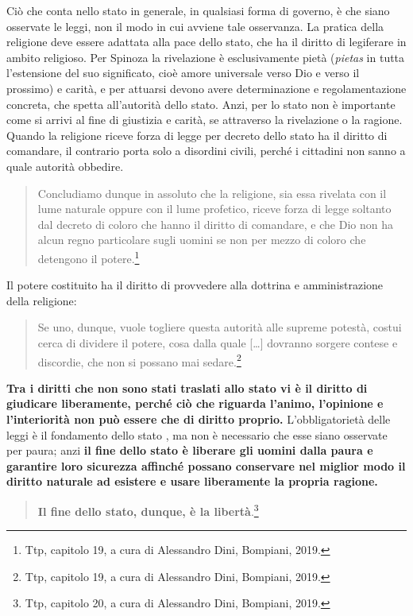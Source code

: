 Ciò che conta nello stato in generale, in qualsiasi forma di governo, è che siano osservate le leggi, non il modo in cui avviene tale osservanza. La pratica della religione deve essere adattata alla pace dello stato, che ha il diritto di legiferare in ambito religioso. Per Spinoza la rivelazione è esclusivamente pietà (\textit{pietas} in tutta l'estensione del suo significato, cioè amore universale verso Dio e verso il prossimo) e carità, e per attuarsi devono avere determinazione e regolamentazione concreta, che spetta all'autorità dello stato. Anzi, per lo stato non è importante come si arrivi al fine di giustizia e carità, se attraverso la rivelazione o la ragione. Quando la religione riceve forza di legge per decreto dello stato ha il diritto di comandare, il contrario porta solo a disordini civili, perché i cittadini non sanno a quale autorità obbedire. 

\begin{quotation}
	\small Concludiamo dunque in assoluto che la religione, sia essa rivelata con il lume naturale oppure con il lume profetico, riceve forza di legge soltanto dal decreto di coloro che hanno il diritto di comandare, e che Dio non ha alcun regno particolare sugli uomini se non per mezzo di coloro che detengono il potere.\footnote{Ttp, capitolo 19, a cura di Alessandro Dini, Bompiani, 2019.}
\end{quotation}

Il potere costituito ha il diritto di provvedere alla dottrina e amministrazione della religione:
\begin{quotation}
	\small Se uno, dunque, vuole togliere questa autorità alle supreme potestà, costui cerca di dividere il potere, cosa dalla quale [\dots] dovranno sorgere contese e discordie, che non si possano mai sedare.\footnote{Ttp, capitolo 19, a cura di Alessandro Dini, Bompiani, 2019.}
\end{quotation}

\textbf{Tra i diritti che non sono stati traslati allo stato vi è il diritto di giudicare liberamente, perché ciò che riguarda l'animo, l'opinione e l'interiorità non può essere che di diritto proprio.} L'obbligatorietà delle leggi è il fondamento dello stato , ma non è necessario che esse siano osservate per paura; anzi \textbf{il fine dello stato è liberare gli uomini dalla paura e garantire  loro sicurezza affinché possano conservare nel miglior modo il diritto naturale ad esistere e usare liberamente la propria ragione.}

\begin{quotation}
	\small \textbf{Il fine dello stato, dunque, è la libertà}.\footnote{Ttp, capitolo 20, a cura di Alessandro Dini, Bompiani, 2019.}
\end{quotation}

